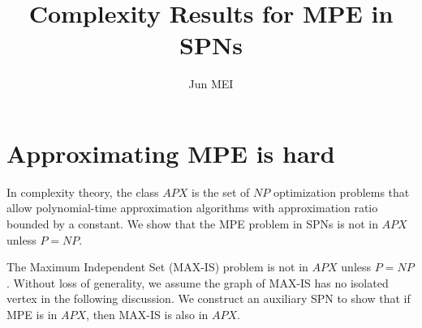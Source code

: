 \documentclass{article}
\title{Complexity Results for MPE in SPNs}
\author{Jun MEI}
\theoremstyle{remark}
\theoremstyle{definition}
\begin{document}
\maketitle

\section{Approximating MPE is hard}
In complexity theory, the class $APX$ is the set of $NP$ optimization problems that allow polynomial-time approximation algorithms with approximation ratio bounded by a constant. We show that the MPE problem in SPNs is not in $APX$ unless $P=NP$.

The Maximum Independent Set (MAX-IS) problem is not in $APX$ unless $P=NP$. Without loss of generality, we assume the graph of MAX-IS has no isolated vertex in the following discussion. We construct an auxiliary SPN to show that if MPE is in $APX$, then MAX-IS is also in $APX$.
\end{document}

